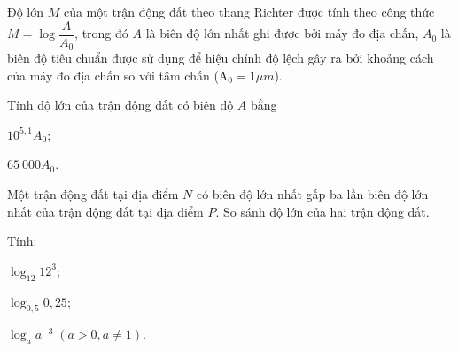 \begin{vd}%
	Độ lớn $ M $ của một trận động đất theo thang Richter được tính theo công thức $ M=\log \dfrac{A}{A_0} $, trong đó $ A $ là biên độ lớn nhất ghi được bởi máy đo địa chấn, $ A_0 $ là biên độ tiêu chuẩn được sử dụng để hiệu chỉnh độ lệch gây ra bởi khoảng cách của máy đo địa chấn so với tâm chấn ($ \mathrm{A}_0=1 \mu m$).
	\begin{listEX}[1]
		\item[a)] Tính độ lớn của trận động đất có biên độ $A$ bằng
		\begin{listEX}[2]
			\item[i)] $ 10^{5{,}1}A_0 $;
			\item[ii)] $ 65~000 A_0$.  
		\end{listEX}
		\item[b)] Một trận động đất tại địa điểm $ N $ có biên độ lớn nhất gấp ba lần biên độ lớn nhất của trận động đất tại địa điểm $ P $. So sánh độ lớn của hai trận động đất.
	\end{listEX}
\end{vd}

\begin{bt} %
	Tính:
	\begin{listEX}[3] 
		\item  $\log _{12} 12^{3}$;
		\item $\log _{0,5} 0{,}25$;
		\item $\log _{a} a^{-3} \;(a>0, a \neq 1)$.
	\end{listEX}
\end{bt}

